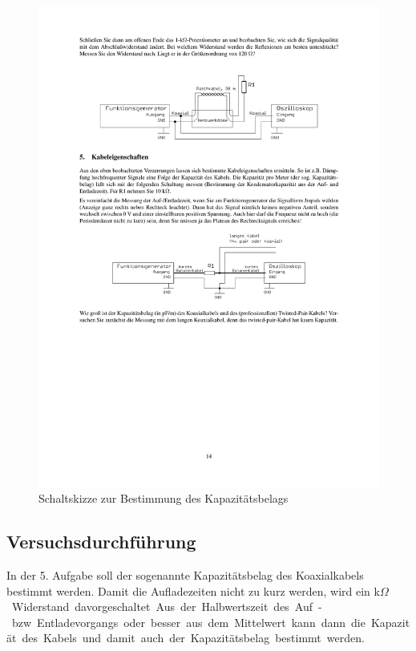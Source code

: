 \documentclass[12pt,a4paper]{article}
\begin{document}
\begin{figure}[H] 
  \centering
    \includegraphics[trim = 10mm 110mm 10mm 140mm, clip, scale = 1]{4-5.pdf}
  	\caption[Schaltskizze zur Bestimmung des Kapazitätsbelags]{Schaltskizze zur Bestimmung des Kapazitätsbelags\footnotemark}
  \label{fig:5}
\end{figure}


\subsection{Versuchsdurchführung}
In der 5. Aufgabe soll der sogenannte Kapazitätsbelag des Koaxialkabels bestimmt werden. Damit die Aufladezeiten nicht zu kurz werden, wird ein \unit[10]{k$\Omega$} Widerstand davorgeschaltet. Aus der Halbwertszeit des Auf- bzw. Entladevorgangs oder besser aus dem Mittelwert kann dann die Kapazität des Kabels und damit auch der Kapazitätsbelag bestimmt werden.
\end{document}
